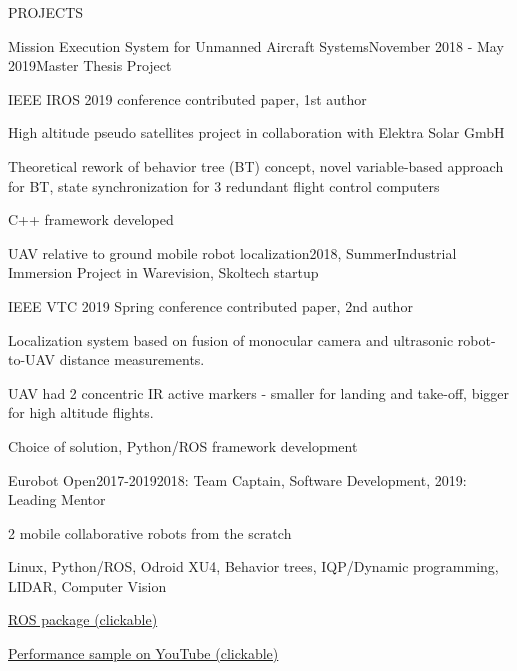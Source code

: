 \documentclass{resume} %
\begin{document}
\begin{rSection}{PROJECTS}


\begin{rSubsection}{Mission Execution System for Unmanned Aircraft Systems}{November 2018 - May 2019}{Master Thesis Project}{} 
\item IEEE IROS 2019 conference contributed paper, 1st author
\item High altitude pseudo satellites project in collaboration with Elektra Solar GmbH 
\item Theoretical rework of behavior tree (BT) concept, novel variable-based approach for BT, state synchronization for 3 redundant flight control computers
\item C++ framework developed

\end{rSubsection} 



\begin{rSubsection}{UAV relative to ground mobile robot localization}{2018, Summer}{Industrial Immersion Project in Warevision, Skoltech startup}{}
\item IEEE VTC 2019 Spring conference contributed paper, 2nd author
\item Localization system based on fusion of monocular camera and ultrasonic robot-to-UAV distance measurements.
\item UAV had 2 concentric IR active markers - smaller for landing and take-off, bigger for high altitude flights.
\item Choice of solution, Python/ROS framework development
\end{rSubsection}



\begin{rSubsection}{Eurobot Open}{2017-2019}{2018: Team Captain, Software Development, 2019: Leading Mentor}{}
\item {}
\item 2 mobile collaborative robots from the scratch
\item Linux, Python/ROS, Odroid XU4, Behavior trees, IQP/Dynamic programming, LIDAR, Computer Vision
\item \href{https://github.com/SkoltechRobotics/ros-eurobot-2018}{ROS package (clickable)} 
\item \href{https://youtu.be/9kTYelf_5CA?t=4115}{Performance sample on YouTube (clickable)}
\end{rSubsection}


\end{rSection}
\end{document}
